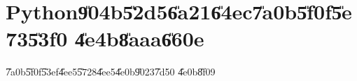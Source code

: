 \documentclass[12pt,a4paper]{article}
\begin{document}
%

\part{Python\U{904b}\U{52d5}\U{6a21}\U{64ec}\U{7a0b}\U{5f0f}\U{5e73}\U{53f0}%
\U{4e4b}\U{8aaa}\U{660e}}

\setcounter{page}{1}

\bigskip

\U{7a0b}\U{5f0f}\U{53ef}\U{4ee5}\U{5728}\U{4ee5}\U{4e0b}\U{9023}\U{7d50}%
\U{4e0b}\U{8f09}

\href{https://github.com/whymranderson/cordtrans/tree/test_1_github}{%
\underline{\color{blue}%
}}
\end{document}
